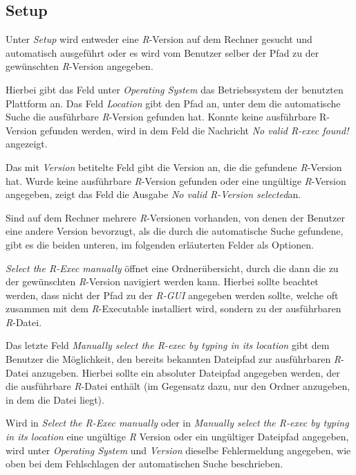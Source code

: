 \documentclass[a4paper, 12pt]{report} %
\begin{document}
\subsection{Setup} \label{Setup}
Unter \textit{Setup} wird entweder eine \textit{R}-Version auf dem Rechner gesucht und automatisch ausgeführt oder es wird vom Benutzer selber der Pfad zu der gewünschten \textit{R}-Version angegeben. 

Hierbei gibt das Feld unter \textit{Operating System} das Betriebssystem der benutzten Plattform an. Das Feld \textit{Location} gibt den Pfad an, unter dem die automatische Suche die ausführbare \textit{R}-Version gefunden hat. Konnte keine ausführbare R-Version gefunden werden, wird in dem Feld die Nachricht \textit{No valid R-exec found!} angezeigt. 

Das mit \textit{Version} betitelte Feld gibt die Version an, die die gefundene \textit{R}-Version hat. Wurde keine ausführbare \textit{R}-Version gefunden oder eine ungültige \textit{R}-Version angegeben, zeigt das Feld die Ausgabe \textit{No valid R-Version selected}an. 

Sind auf dem Rechner mehrere \textit{R}-Versionen vorhanden, von denen der Benutzer eine andere Version bevorzugt, als die durch die automatische Suche gefundene, gibt es die beiden unteren, im folgenden erläuterten Felder als Optionen. 

\textit{Select the R-Exec manually} öffnet eine Ordnerübersicht, durch die dann die zu der gewünschten \textit{R}-Version navigiert werden kann. Hierbei sollte beachtet werden, dass nicht der Pfad zu der \textit{R-GUI} angegeben werden sollte, welche oft zusammen mit dem \textit{R}-Executable installiert wird, sondern zu der ausführbaren \textit{R}-Datei.
  
Das letzte Feld \textit{Manually select the R-exec by typing in its location} gibt dem Benutzer die Möglichkeit, den bereits bekannten Dateipfad zur ausführbaren \textit{R}-Datei anzugeben. Hierbei sollte ein absoluter Dateipfad angegeben werden, der die ausführbare \textit{R}-Datei enthält (im Gegensatz dazu, nur den Ordner anzugeben, in dem die Datei liegt). 

Wird in \textit{Select the R-Exec manually} oder in \textit{Manually select the R-exec by typing in its location} eine ungültige \textit{R} Version oder ein ungültiger Dateipfad angegeben, wird unter \textit{Operating System} und \textit{Version} dieselbe Fehlermeldung angegeben, wie oben bei dem Fehlschlagen der automatischen Suche beschrieben. 
\end{document}
